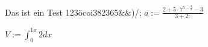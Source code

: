 % 
%
\usepackage{amsmath}




Das ist ein Test 123öcoi382365&&)/;
$a:=\frac{2+5 \cdot 7^{5-\frac{3}{2}}-3}{3+2;}$


$V:=\int_{0}^{1x}2dx$




